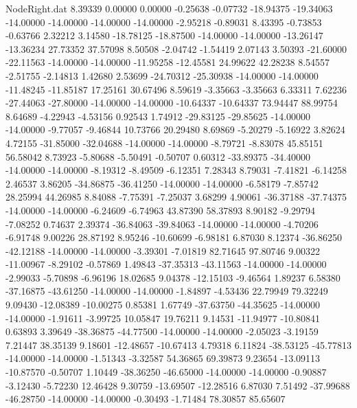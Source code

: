 \begin{filecontents}{NodeRight.dat}
   8.39339    0.00000    0.00000    -0.25638   -0.07732  -18.94375  -19.34063  -14.00000  -14.00000  -14.00000  -14.00000   -2.95218   -0.89031
   8.43395   -0.73853   -0.63766     2.32212    3.14580  -18.78125  -18.87500  -14.00000  -14.00000  -13.26147  -13.36234   27.73352   37.57098
   8.50508   -2.04742   -1.54419     2.07143    3.50393  -21.60000  -22.11563  -14.00000  -14.00000  -11.95258  -12.45581   24.99622   42.28238
   8.54557   -2.51755   -2.14813     1.42680    2.53699  -24.70312  -25.30938  -14.00000  -14.00000  -11.48245  -11.85187   17.25161   30.67496
   8.59619   -3.35663   -3.35663     6.33311    7.62236  -27.44063  -27.80000  -14.00000  -14.00000  -10.64337  -10.64337   73.94447   88.99754
   8.64689   -4.22943   -4.53156     0.92543    1.74912  -29.83125  -29.85625  -14.00000  -14.00000   -9.77057   -9.46844   10.73766   20.29480
   8.69869   -5.20279   -5.16922     3.82624    4.72155  -31.85000  -32.04688  -14.00000  -14.00000   -8.79721   -8.83078   45.85151   56.58042
   8.73923   -5.80688   -5.50491    -0.50707    0.60312  -33.89375  -34.40000  -14.00000  -14.00000   -8.19312   -8.49509   -6.12351    7.28343
   8.79031   -7.41821   -6.14258     2.46537    3.86205  -34.86875  -36.41250  -14.00000  -14.00000   -6.58179   -7.85742   28.25994   44.26985
   8.84088   -7.75391   -7.25037     3.68299    4.90061  -36.37188  -37.74375  -14.00000  -14.00000   -6.24609   -6.74963   43.87390   58.37893
   8.90182   -9.29794   -7.08252     0.74637    2.39374  -36.84063  -39.84063  -14.00000  -14.00000   -4.70206   -6.91748    9.00226   28.87192
   8.95246  -10.60699   -6.98181     6.87030    8.12374  -36.86250  -42.12188  -14.00000  -14.00000   -3.39301   -7.01819   82.71645   97.80746
   9.00322  -11.00967   -8.29102    -0.57869    1.49843  -37.35313  -43.11563  -14.00000  -14.00000   -2.99033   -5.70898   -6.96196   18.02685
   9.04378  -12.15103   -9.46564     1.89237    6.58380  -37.16875  -43.61250  -14.00000  -14.00000   -1.84897   -4.53436   22.79949   79.32249
   9.09430  -12.08389  -10.00275     0.85381    1.67749  -37.63750  -44.35625  -14.00000  -14.00000   -1.91611   -3.99725   10.05847   19.76211
   9.14531  -11.94977  -10.80841     0.63893    3.39649  -38.36875  -44.77500  -14.00000  -14.00000   -2.05023   -3.19159    7.21447   38.35139
   9.18601  -12.48657  -10.67413     4.79318    6.11824  -38.53125  -45.77813  -14.00000  -14.00000   -1.51343   -3.32587   54.36865   69.39873
   9.23654  -13.09113  -10.87570    -0.50707    1.10449  -38.36250  -46.65000  -14.00000  -14.00000   -0.90887   -3.12430   -5.72230   12.46428
   9.30759  -13.69507  -12.28516     6.87030    7.51492  -37.99688  -46.28750  -14.00000  -14.00000   -0.30493   -1.71484   78.30857   85.65607

\end{filecontents}
